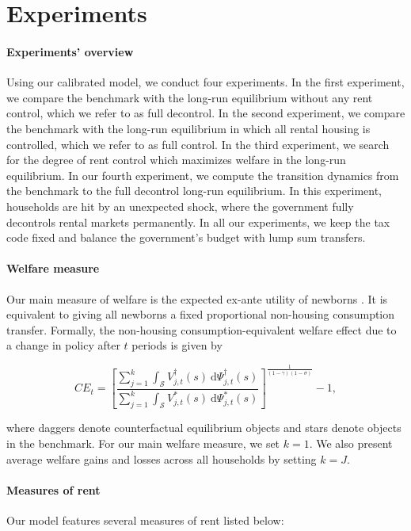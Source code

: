 \documentclass[parskip=full]{article}
\begin{document}
\section{Experiments}\label{section:experiments}

\paragraph{Experiments' overview} Using our calibrated model, we conduct four experiments. In the first experiment, we compare the benchmark with the long-run equilibrium without any rent control, which we refer to as full decontrol. In the second experiment, we compare the benchmark with the long-run equilibrium in which all rental housing is controlled, which we refer to as full control. In the third experiment, we search for the degree of rent control which maximizes welfare in the long-run equilibrium. In our fourth experiment, we compute the transition dynamics from the benchmark to the full decontrol long-run equilibrium. In this experiment, households are hit by an unexpected shock, where the government fully decontrols rental markets permanently. In all our experiments, we keep the tax code fixed and balance the government's budget with lump sum transfers. 

\paragraph{Welfare measure} Our main measure of welfare is the expected ex-ante utility of newborns \citep{ralws-1971,conesa-et-al,gkkoc}. It is equivalent to giving all newborns a fixed proportional non-housing consumption transfer. Formally, the non-housing consumption-equivalent welfare effect due to a change in policy after $t$ periods is given by

\begin{equation*}
  CE_{t} = \left[\frac{\sum_{j=1}^{k}\int_{\mathcal{S}}V^{\dagger}_{j,t}(s)\ \mathrm{d}\Psi^{\dagger}_{j,t}(s)}{\sum_{j=1}^{k}\int_{\mathcal{S}}V^*_{j,t}(s)\ \mathrm{d}\Psi^*_{j,t}(s)}\right]^{\frac{1}{(1-\gamma)(1-\sigma)}}-1,
\end{equation*}

\noindent where daggers denote counterfactual equilibrium objects and stars denote objects in the benchmark. For our main welfare measure, we set $k=1$. We also present average welfare gains and losses across all households by setting $k=J$.

\paragraph{Measures of rent} Our model features several measures of rent listed below: 
\end{document}
